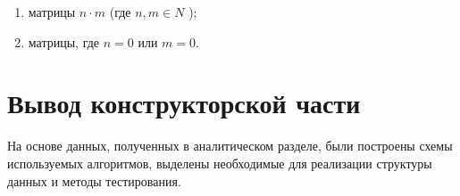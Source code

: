 \begin{enumerate}
    \item матрицы $ n\cdot m $ (где $n, m\in N$ );
    \item матрицы, где $ n = 0 $ или $ m = 0 $.
\end{enumerate}




\section{Вывод конструкторской части}\label{KonstructResult}
На основе данных, полученных в аналитическом разделе, были построены схемы используемых алгоритмов,
выделены необходимые для реализации структуры данных и методы тестирования.

